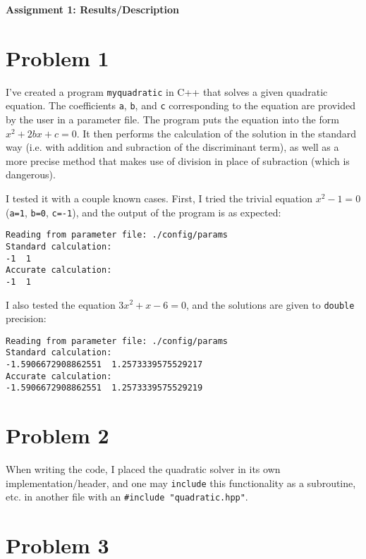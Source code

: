 \documentclass[12pt]{article}
\begin{document}
\begin{center}\begin{LARGE}
\textbf{Assignment 1: Results/Description}
\end{LARGE}\end{center}

\section*{Problem 1}

I've created a program \texttt{myquadratic} in C++ that solves a given
quadratic equation. The coefficients \texttt{a}, \texttt{b}, and \texttt{c}
corresponding to the equation are provided by the user in a parameter file. The
program puts the equation into the form $x^2 + 2bx + c = 0$. It then performs
the calculation of the solution in the standard way (i.e. with addition and
subraction of the discriminant term), as well as a more precise method that
makes use of division in place of subraction (which is dangerous).

I tested it with a couple known cases. First, I tried the trivial equation
$x^2 - 1 = 0$ (\texttt{a=1}, \texttt{b=0}, \texttt{c=-1}), and the output of
the program is as expected:
\begin{verbatim}
Reading from parameter file: ./config/params
Standard calculation:
-1  1
Accurate calculation:
-1  1
\end{verbatim}

I also tested the equation $3x^2 + x - 6 = 0$, and the solutions are given to
\texttt{double} precision:
\begin{verbatim}
Reading from parameter file: ./config/params
Standard calculation:
-1.5906672908862551  1.2573339575529217
Accurate calculation:
-1.5906672908862551  1.2573339575529219
\end{verbatim}

\section*{Problem 2}

When writing the code, I placed the quadratic solver in its own
implementation/header, and one may \texttt{include} this functionality as a
subroutine, etc. in another file with an \texttt{\#include "quadratic.hpp"}.

\section*{Problem 3}
\end{document}
